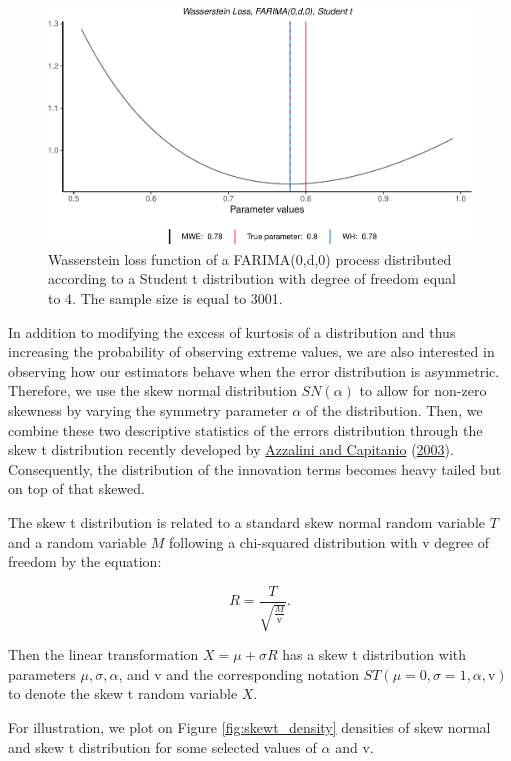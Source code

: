 \documentclass[
  11pt,
]{article}
\begin{document}
\begin{figure}

{\centering \includegraphics[width=0.5\linewidth]{Master_thesis_V4_files/figure-latex/Student_t-1} 

}

\caption{Wasserstein loss function of a FARIMA(0,d,0) process distributed according to a Student t distribution with degree of freedom equal to 4. The sample size is equal to 3001.}\label{fig:Student_t}
\end{figure}

In addition to modifying the excess of kurtosis of a distribution and
thus increasing the probability of observing extreme values, we are also
interested in observing how our estimators behave when the error
distribution is asymmetric. Therefore, we use the skew normal
distribution \(SN(\alpha)\) to allow for non-zero skewness by varying
the symmetry parameter \(\alpha\) of the distribution. Then, we combine
these two descriptive statistics of the errors distribution through the
skew t distribution recently developed by
\protect\hyperlink{ref-azzalini2003distributions}{Azzalini and
Capitanio} (\protect\hyperlink{ref-azzalini2003distributions}{2003}).
Consequently, the distribution of the innovation terms becomes heavy
tailed but on top of that skewed.

The skew t distribution is related to a standard skew normal random
variable \(T\) and a random variable \(M\) following a chi-squared
distribution with \(\mathrm{v}\) degree of freedom by the equation:

\[R=\frac{T}{\sqrt{\frac{M}{\mathrm{v}}}}.\]

Then the linear transformation \(X=\mu+\sigma R\) has a skew t
distribution with parameters \(\mu, \sigma, \alpha\), and \(\mathrm{v}\)
and the corresponding notation
\(S T(\mu = 0, \sigma = 1, \alpha, \mathrm{v})\) to denote the skew t
random variable \(X\).

For illustration, we plot on Figure \ref{fig:skewt_density} densities of
skew normal and skew t distribution for some selected values of
\(\alpha\) and \(\mathrm{v}\).
\end{document}
